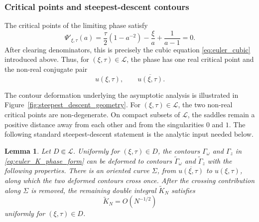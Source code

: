 \documentclass[11pt]{article}
\numberwithin{equation}{section}
\newtheorem{lemma}[theorem]{Lemma}
\newcommand{\1}{\mathbf 1}
\begin{document}
\subsubsection{Critical points and steepest-descent contours}

The critical points of the limiting phase satisfy
\[
    \Psi'_{\xi,\tau}(a)
    =
    \frac{\tau}{2}\left(1-a^{-2}\right)
    -\frac{\xi}{a}
    +\frac{1}{a-1}
    =0.
\]
After clearing denominators, this is precisely the cubic equation
\eqref{eq:euler_cubic} introduced above. Thus, for
\((\xi,\tau)\in\mathcal L\), the phase has one real critical point and the
non-real conjugate pair
\[
    u(\xi,\tau),
    \qquad
    \overline{u(\xi,\tau)}.
\]

The contour deformation underlying the asymptotic analysis is illustrated in Figure~\ref{fig:steepest_descent_geometry}.
For \((\xi,\tau)\in\mathcal L\), the two non-real critical points are
non-degenerate.  On compact subsets of \(\mathcal L\), the saddles remain a
positive distance away from each other and from the singularities \(0\) and
\(1\).  The following standard steepest-descent statement is the analytic input
needed below.

\begin{lemma}
\label{lem:euler_steepest_descent_contours}
Let \(D\Subset\mathcal L\).  Uniformly for \((\xi,\tau)\in D\), the contours
\(\Gamma_\omega\) and \(\Gamma_z\) in \eqref{eq:euler_K_phase_form} can be
deformed to contours \(\widetilde\Gamma_\omega\) and
\(\widetilde\Gamma_z\) with the following properties.
There is an oriented curve \(\Sigma\), from \(\overline{u(\xi,\tau)}\) to
\(u(\xi,\tau)\), along which the two deformed contours cross once.  After the
crossing contribution along \(\Sigma\) is removed, the remaining double integral
\(\widetilde K_N\) satisfies
\begin{equation}
    \widetilde K_N=O(N^{-1/2})
    \label{eq:euler_K_tilde_bound}
\end{equation}
uniformly for \((\xi,\tau)\in D\).
\end{lemma}
\end{document}
